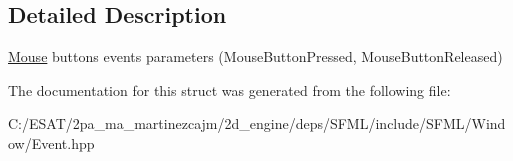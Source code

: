 \subsection{Detailed Description}
\hyperlink{classsf_1_1_mouse}{Mouse} buttons events parameters (Mouse\+Button\+Pressed, Mouse\+Button\+Released) 

The documentation for this struct was generated from the following file\+:\begin{DoxyCompactItemize}
\item 
C\+:/\+E\+S\+A\+T/2pa\+\_\+ma\+\_\+martinezcajm/2d\+\_\+engine/deps/\+S\+F\+M\+L/include/\+S\+F\+M\+L/\+Window/Event.\+hpp\end{DoxyCompactItemize}

